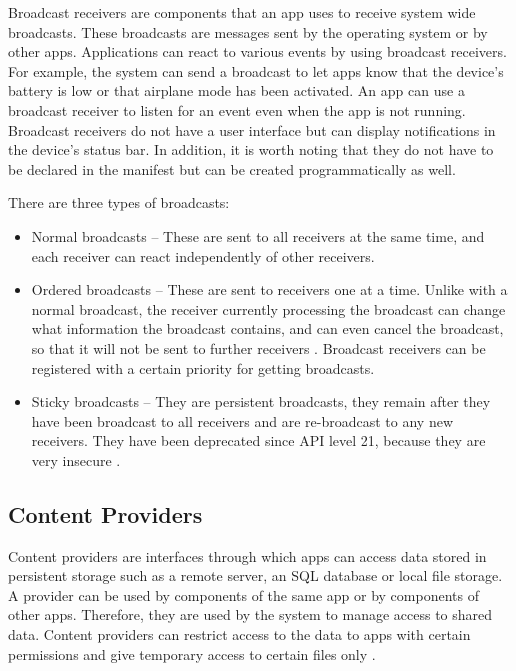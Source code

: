     Broadcast receivers are components that an app uses to receive system wide broadcasts. These broadcasts are messages sent by the operating system or by other apps. Applications can react to various events by using broadcast receivers. For example, the system can send a broadcast to let apps know that the device’s battery is low or that airplane mode has been activated. An app can use a broadcast receiver to listen for an event even when the app is not running. Broadcast receivers do not have a user interface but can display notifications in the device’s status bar. In addition, it is worth noting that they do not have to be declared in the manifest but can be created programmatically as well.
    
    There are three types of broadcasts:
    \begin{itemize}
        \item Normal broadcasts – These are sent to all receivers at the same time, and each receiver can react independently of other receivers.
        \item Ordered broadcasts – These are sent to receivers one at a time. Unlike with a normal broadcast, the receiver currently processing the broadcast can change what information the broadcast contains, and can even cancel the broadcast, so that it will not be sent to further receivers \cite{broadcasts_overview}. Broadcast receivers can be registered with a certain priority for getting broadcasts.
        \item Sticky broadcasts – They are persistent broadcasts, they remain after they have been broadcast to all receivers and are re-broadcast to any new receivers. They have been deprecated since API level 21, because they are very insecure \cite{sticky_broadcast}.
    \end{itemize}
    
    \subsection{Content Providers}
        \label{subsec:content_providers}
        
    Content providers are interfaces through which apps can access data stored in persistent storage such as a remote server, an SQL database or local file storage. A provider can be used by components of the same app or by components of other apps. Therefore, they are used by the system to manage access to shared data. Content providers can restrict access to the data to apps with certain permissions and give temporary access to certain files only \cite{android_app_fundamentals}.
    
